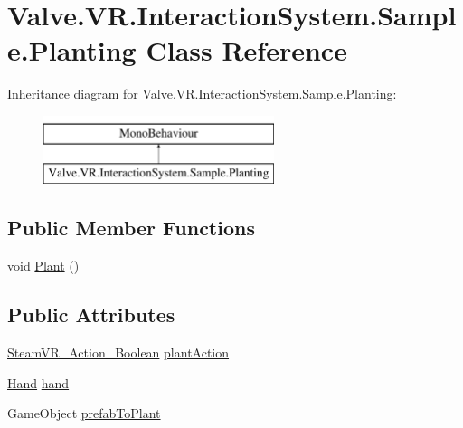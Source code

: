 \hypertarget{class_valve_1_1_v_r_1_1_interaction_system_1_1_sample_1_1_planting}{}\section{Valve.\+V\+R.\+Interaction\+System.\+Sample.\+Planting Class Reference}
\label{class_valve_1_1_v_r_1_1_interaction_system_1_1_sample_1_1_planting}
Inheritance diagram for Valve.\+V\+R.\+Interaction\+System.\+Sample.\+Planting\+:\begin{figure}[H]
\begin{center}
\leavevmode
\includegraphics[height=2.000000cm]{class_valve_1_1_v_r_1_1_interaction_system_1_1_sample_1_1_planting}
\end{center}
\end{figure}
\subsection*{Public Member Functions}
\begin{DoxyCompactItemize}
\item 
void \mbox{\hyperlink{class_valve_1_1_v_r_1_1_interaction_system_1_1_sample_1_1_planting_a59a2e96968d7cc00edc20b84abf8cd37}{Plant}} ()
\end{DoxyCompactItemize}
\subsection*{Public Attributes}
\begin{DoxyCompactItemize}
\item 
\mbox{\hyperlink{class_valve_1_1_v_r_1_1_steam_v_r___action___boolean}{Steam\+V\+R\+\_\+\+Action\+\_\+\+Boolean}} \mbox{\hyperlink{class_valve_1_1_v_r_1_1_interaction_system_1_1_sample_1_1_planting_a8b25594c76fa85d1e63c4248c082491a}{plant\+Action}}
\item 
\mbox{\hyperlink{class_valve_1_1_v_r_1_1_interaction_system_1_1_hand}{Hand}} \mbox{\hyperlink{class_valve_1_1_v_r_1_1_interaction_system_1_1_sample_1_1_planting_a708381a5ede501d7df2ad3ecc5ff3073}{hand}}
\item 
Game\+Object \mbox{\hyperlink{class_valve_1_1_v_r_1_1_interaction_system_1_1_sample_1_1_planting_a9581cc8bf1a84a1eb581616abc3b14a0}{prefab\+To\+Plant}}
\end{DoxyCompactItemize}


